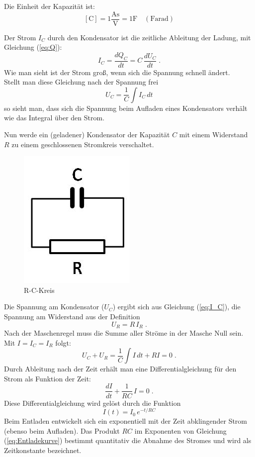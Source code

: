 \noindent
Die Einheit der Kapazität ist:
\begin{equation}
 \mathrm{\left[C\right] = 1\frac{As}{V} = 1 F \quad (Farad)}
\end{equation}

\noindent
Der Strom $I_C$ durch den Kondensator ist die zeitliche Ableitung der Ladung, mit Gleichung (\ref{eq:Q}):
\begin{equation}
 I_C = \frac{dQ_C}{dt} = C\,\frac{dU_C}{dt}\; .
 \label{eq:I_C}
\end{equation}
Wie man sieht ist der Strom groß, wenn sich die Spannung schnell ändert.\\
Stellt man diese Gleichung nach der Spannung frei
\begin{equation}
 U_C = \frac{1}{C}\int{I_C\, dt}
\end{equation}
so sieht man, dass sich die Spannung beim Aufladen eines Kondensators verhält wie das Integral über den Strom.

Nun werde ein (geladener) Kondensator der Kapazität $C$ mit einem Widerstand $R$ zu einem geschlossenen Stromkreis verschaltet.
\begin{figure}[h]
	\centering
		\includegraphics[width=.1\textwidth]{Abbildungen/RC-Kreis.jpg}
	\caption{R-C-Kreis}
	\label{fig:RC-Kreis}
\end{figure}
Die Spannung am Kondensator ($U_C$) ergibt sich aus Gleichung (\ref{eq:I_C}), die Spannung am Widerstand aus der Definition
\begin{equation}
 U_R = R\, I_R\; .
\end{equation}
Nach der Maschenregel muss die Summe aller Ströme in der Masche Null sein. Mit $I = I_C = I_R$ folgt:
\begin{equation}
 U_C + U_R = \frac{1}{C}\int{I\, dt} + R I = 0\; .
\end{equation}
Durch Ableitung nach der Zeit erhält man eine Differentialgleichung für den Strom als Funktion der Zeit:
\begin{equation}
 \frac{dI}{dt} + \frac{1}{RC}\,I = 0\; .
\end{equation}
Diese Differentialgleichung wird gelöst durch die Funktion
\begin{equation}
 I(t) = I_0\, e^{-t/RC}
 \label{eq:Entladekurve}
\end{equation}
Beim Entladen entwickelt sich ein exponentiell mit der Zeit abklingender Strom (ebenso beim Aufladen). Das Produkt $RC$ im Exponenten von Gleichung (\ref{eq:Entladekurve}) bestimmt quantitativ die Abnahme des Stromes und wird als Zeitkonstante bezeichnet.\\

